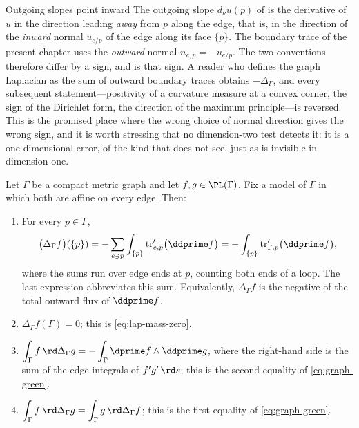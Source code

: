 \begin{warning}{Outgoing slopes point inward}
The outgoing slope $d_\nu u(p)$ of  is the
derivative of $u$ in the direction leading \emph{away} from $p$ along the
edge, that is, in the direction of the \emph{inward} normal $u_{e/p}$ of the
edge along its face $\{p\}$.  The boundary trace of the present chapter uses
the \emph{outward} normal $n_{e,p}=-u_{e/p}$.  The two conventions therefore
differ by a sign, and  is that sign.  A reader who
defines the graph Laplacian as the sum of outward boundary traces obtains
$-\Delta_\Gamma$, and every subsequent statement---positivity of a curvature
measure at a convex corner, the sign of the Dirichlet form, the direction of
the maximum principle---is reversed.  This is the promised place where the
wrong choice of normal direction gives the wrong sign, and it is worth stressing
that no dimension-two test detects it: it is a one-dimensional error, of the
kind that  does not see, just as
 is invisible in dimension one.
\end{warning}

\begin{theorem}
\label{thm:ch11-graph-green}
Let $\Gamma$ be a compact metric graph and let $f,g\in\PL(\Gamma)$.  Fix a
model of $\Gamma$ in which both are affine on every edge.  Then:
\begin{enumerate}
\item\label{itm:ch11-graph:lap}
  For every $p\in\Gamma$,
  \[
   \bigl(\Delta_\Gamma f\bigr)(\{p\})
   =-\sum_{e\ni p}\int_{\{p\}}\operatorname{tr}'_{e,p}\bigl(\ddprime f\bigr)
   =-\int_{\{p\}}\operatorname{tr}'_{\Gamma,p}\bigl(\ddprime f\bigr),
  \]
  where the sums run over edge ends at $p$, counting both ends of a loop.
  The last expression abbreviates this sum.  Equivalently,
  $\Delta_\Gamma f$ is the negative of the total
  outward flux of $\ddprime f$.
\item\label{itm:ch11-graph:mass}
  $\Delta_\Gamma f(\Gamma)=0$; this is \eqref{eq:lap-mass-zero}.
\item\label{itm:ch11-graph:parts}
  $\displaystyle\int_\Gamma f\,\rd\Delta_\Gamma g
   =-\int_\Gamma\dprime f\wedge\ddprime g$, where the right-hand side is the
  sum of the edge integrals of $f'g'\,\rd s$; this is the second equality of
  \eqref{eq:graph-green}.
\item\label{itm:ch11-graph:sym}
  $\displaystyle\int_\Gamma f\,\rd\Delta_\Gamma g
   =\int_\Gamma g\,\rd\Delta_\Gamma f$; this is the first equality of
  \eqref{eq:graph-green}.
\end{enumerate}
\end{theorem}

